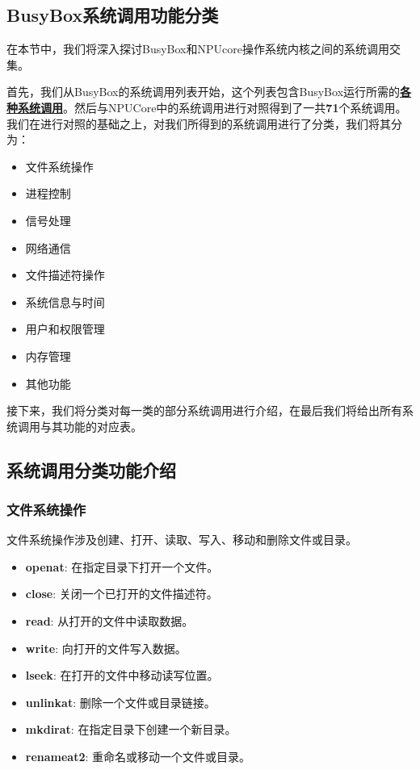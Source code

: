 \subsection{BusyBox系统调用功能分类}
    
在本节中，我们将深入探讨BusyBox和NPUcore操作系统内核之间的系统调用交集。

首先，我们从BusyBox的系统调用列表开始，这个列表包含BusyBox运行所需的\textbf{\href{https://gitee.com/oscomp/testsuits-for-oskernel/blob/final-comp/docs/busybox_musl_static_syscall.txt}{各种系统调用}}。然后与NPUCore中的系统调用进行对照得到了一共\textbf{71}个系统调用。我们在进行对照的基础之上，对我们所得到的系统调用进行了分类，我们将其分为：

\begin{itemize}
  \item 文件系统操作
  \item 进程控制
  \item 信号处理
  \item 网络通信
  \item 文件描述符操作
  \item 系统信息与时间
  \item 用户和权限管理
  \item 内存管理
  \item 其他功能
\end{itemize}
接下来，我们将分类对每一类的部分系统调用进行介绍，在最后我们将给出所有系统调用与其功能的对应表。
\subsection{系统调用分类功能介绍}
\subsubsection*{文件系统操作}
文件系统操作涉及创建、打开、读取、写入、移动和删除文件或目录。
\begin{itemize}
    \item \textbf{openat}: 在指定目录下打开一个文件。
    \item \textbf{close}: 关闭一个已打开的文件描述符。
    \item \textbf{read}: 从打开的文件中读取数据。
    \item \textbf{write}: 向打开的文件写入数据。
    \item \textbf{lseek}: 在打开的文件中移动读写位置。
    \item \textbf{unlinkat}: 删除一个文件或目录链接。
    \item \textbf{mkdirat}: 在指定目录下创建一个新目录。
    \item \textbf{renameat2}: 重命名或移动一个文件或目录。
\end{itemize}
